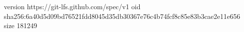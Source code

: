 version https://git-lfs.github.com/spec/v1
oid sha256:6a40d5d09bd76521fdd8045d35db30367e76c4b74fcf8c85e83b3cae2e11e656
size 181249

